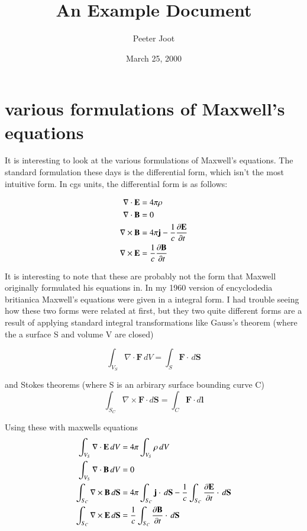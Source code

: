 \documentclass{article}      %
\title{An Example Document}  %
\author{Peeter Joot}         %
\date{March 25, 2000}        %
\newcommand{\Curl}[1]{\nabla \times \mathbf{#1}}
\newcommand{\Diverg}[1]{\nabla \cdot \mathbf{#1}}
\newcommand{\Ddt}[1]{ {{\partial{\mathbf{#1}}} \over {\partial{t}}}}
\newcommand{\Bj}[0]{\mathbf{j}}
\newcommand{\BS}[0]{\mathbf{S}}
\begin{document}


\section{various formulations of Maxwell's equations}

It is interesting to look at the various formulations of Maxwell's 
equations.  The standard formulation these days is the differential
form, which isn't the most intuitive form.  In cgs units, the differential
form is as follows:

\begin{align*}
\Diverg E &= 4\pi\rho \\
\Diverg B &= 0 \\
\Curl{B} &= 4\pi \Bj - {1 \over c} \Ddt{E} \\
\Curl{E} &= {1 \over c} \Ddt{B}
\end{align*}

It is interesting to note that these are probably not the form that Maxwell 
originally formulated his equations in.  In my 1960 version of encyclodedia 
britianica Maxwell's equations were given in a integral form.  I had 
trouble seeing how these two forms were related at first, but they two 
quite different forms are a result of applying standard integral 
transformations like Gauss's theorem (where the a surface S and volume V are closed)

\begin{equation*}
\int_{V_S} \Diverg{F}\,dV =
\int_S \mathbf{F} \cdot\, d\BS 
\end{equation*}

and Stokes theorems (where S is an arbirary surface bounding curve C)
\begin{equation*}
\int_{S_C} \Curl{F} \cdot d\BS = \int_C \mathbf{F} \cdot d\mathbf{l}
\end{equation*}

Using these with maxwells equations
\begin{align*}
\int_{V_S} \Diverg E \, dV &= 4\pi \int_{V_S} \rho\, dV \\
\int_{V_S} \Diverg B \, dV &= 0 \\
\int_{S_C} \Curl{B} \, d\BS &= 4\pi \int_{S_C} \Bj \cdot \, d\BS - {1 \over c} \int_{S_C} \Ddt{E} \cdot \, d\BS \\
\int_{S_C} \Curl{E} \, d\BS &= {1 \over c} \int_{S_C} \Ddt{B} \cdot \, d\BS
\end{align*}
\end{document}
